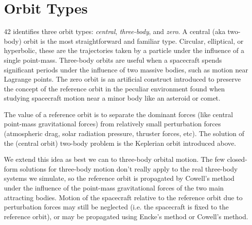 \documentclass[12pt]{article}
\begin{document}
\section{Orbit Types}

42 identifies three orbit types: {\em central}, {\em three-body}, and {\em zero}.  A central (aka two-body) orbit is the most straightforward and familiar type.  Circular, elliptical, or hyperbolic, these are the trajectories taken by a particle under the influence of a single point-mass.  Three-body orbits are useful when a spacecraft spends significant periods under the influence of two massive bodies, such as motion near Lagrange points.  The zero orbit is an artificial construct introduced to preserve the concept of the reference orbit in the peculiar environment found when studying spacecraft motion near a minor body like an asteroid or comet.

The value of a reference orbit is to separate the dominant forces (like central point-mass gravitational forces) from relatively small perturbation forces (atmospheric drag, solar radiation pressure, thruster forces, etc).  The solution of the (central orbit) two-body problem is the Keplerian orbit introduced above.  

We extend this idea as best we can to three-body orbital motion.  The few closed-form solutions for three-body motion don't really apply to the real three-body systems we simulate, so the reference orbit is propagated by Cowell's method under the influence of the point-mass gravitational forces of the two main attracting bodies.  Motion of the spacecraft relative to the reference orbit due to perturbation forces may still be neglected (i.e. the spacecraft is fixed to the reference orbit), or may be propagated using Encke's method or Cowell's method.
\end{document}
